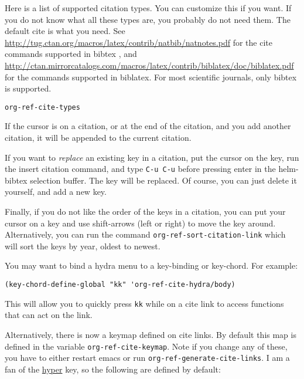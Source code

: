 \documentclass[11pt]{article}
\begin{document}
Here is a list of supported citation types. You can customize this if you want. If you do not know what all these types are, you probably do not need them. The default cite is what you need. See \url{http://tug.ctan.org/macros/latex/contrib/natbib/natnotes.pdf}
 for the cite commands supported in bibtex , and \url{http://ctan.mirrorcatalogs.com/macros/latex/contrib/biblatex/doc/biblatex.pdf}
 for the commands supported in biblatex. For most scientific journals, only bibtex is supported. 

\begin{verbatim}
org-ref-cite-types
\end{verbatim}

If the cursor is on a citation, or at the end of the citation, and you add another citation, it will be appended to the current citation.

If you want to \emph{replace} an existing key in a citation, put the cursor on the key, run the insert citation command, and type \texttt{C-u C-u} before pressing enter in the helm-bibtex selection buffer. The key will be replaced. Of course, you can just delete it yourself, and add a new key.

Finally, if you do not like the order of the keys in a citation, you can put your cursor on a key and use shift-arrows (left or right) to move the key around. Alternatively, you can run the command \texttt{org-ref-sort-citation-link} which will sort the keys by year, oldest to newest.

You may want to bind a hydra menu to a key-binding or key-chord. For example:

\begin{verbatim}
(key-chord-define-global "kk" 'org-ref-cite-hydra/body)
\end{verbatim}

This will allow you to quickly press \texttt{kk} while on a cite link to access functions that can act on the link.

Alternatively, there is now a keymap defined on cite links. By default this map is defined in the variable \texttt{org-ref-cite-keymap}. Note if you change any of these, you have to either restart emacs or run \texttt{org-ref-generate-cite-links}. I am a fan of the \href{http://ergoemacs.org/emacs/emacs\_hyper\_super\_keys.html}{hyper} key, so the following are defined by default:
\end{document}
